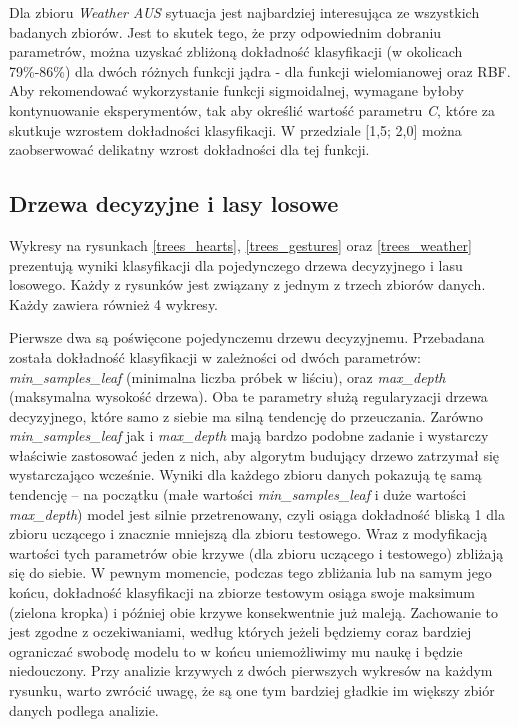 \documentclass{classrep}
\begin{document}
{{             Dla zbioru \textit{Weather AUS} \cite{dataset_weather_aus} sytuacja jest najbardziej interesująca ze wszystkich badanych zbiorów. Jest to skutek tego, że przy odpowiednim dobraniu parametrów, można uzyskać zbliżoną dokładność klasyfikacji (w okolicach 79\%-86\%) dla dwóch różnych funkcji jądra - dla funkcji wielomianowej oraz RBF. Aby rekomendować wykorzystanie funkcji sigmoidalnej, wymagane byłoby kontynuowanie eksperymentów, tak aby określić wartość parametru \emph{C}, które za skutkuje wzrostem dokładności klasyfikacji. W przedziale [1,5; 2,0] można zaobserwować delikatny wzrost dokładności dla tej funkcji.
        }

        \subsection{Drzewa decyzyjne i lasy losowe}
        \label{drzewa_decyzyjne_summary} {
            Wykresy na rysunkach \ref{trees_hearts}, \ref{trees_gestures} oraz \ref{trees_weather} prezentują wyniki klasyfikacji dla pojedynczego drzewa decyzyjnego i lasu losowego. Każdy z rysunków jest związany z jednym z trzech zbiorów danych. Każdy zawiera również 4 wykresy. 
            
            Pierwsze dwa są poświęcone pojedynczemu drzewu decyzyjnemu. Przebadana została dokładność klasyfikacji w zależności od dwóch parametrów: \emph{min\_samples\_leaf} (minimalna liczba próbek w liściu), oraz \emph{max\_depth} (maksymalna wysokość drzewa). Oba te parametry służą regularyzacji drzewa decyzyjnego, które samo z siebie ma silną tendencję do przeuczania. Zarówno \emph{min\_samples\_leaf} jak i \emph{max\_depth} mają bardzo podobne zadanie i wystarczy właściwie zastosować jeden z nich, aby algorytm budujący drzewo zatrzymał się wystarczająco wcześnie. Wyniki dla każdego zbioru danych pokazują tę samą tendencję -- na początku (małe wartości \emph{min\_samples\_leaf} i duże wartości \emph{max\_depth}) model jest silnie przetrenowany, czyli osiąga dokładność bliską 1 dla zbioru uczącego i znacznie mniejszą dla zbioru testowego. Wraz z modyfikacją wartości tych parametrów obie krzywe (dla zbioru uczącego i testowego) zbliżają się do siebie. W pewnym momencie, podczas tego zbliżania lub na samym jego końcu, dokładność klasyfikacji na zbiorze testowym osiąga swoje maksimum (zielona kropka) i później obie krzywe konsekwentnie już maleją. Zachowanie to jest zgodne z oczekiwaniami, według których jeżeli będziemy coraz bardziej ograniczać swobodę modelu to w końcu uniemożliwimy mu naukę i będzie niedouczony. Przy analizie krzywych z dwóch pierwszych wykresów na każdym rysunku, warto zwrócić uwagę, że są one tym bardziej gładkie im większy zbiór danych podlega analizie.
            
}}
\end{document}
